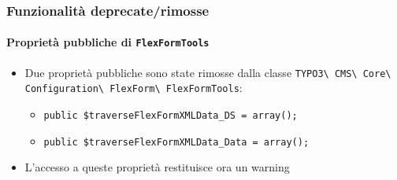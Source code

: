 \begin{frame}[fragile]
	\frametitle{Funzionalità deprecate/rimosse}
	\framesubtitle{Proprietà pubbliche di \texttt{FlexFormTools}}

	\begin{itemize}
		\item Due proprietà pubbliche sono state rimosse dalla classe
			\texttt{TYPO3\textbackslash
				CMS\textbackslash
				Core\textbackslash
				Configuration\textbackslash
				FlexForm\textbackslash
				FlexFormTools}:

		\begin{itemize}
			\item \texttt{public \$traverseFlexFormXMLData\_DS = array();}
			\item \texttt{public \$traverseFlexFormXMLData\_Data = array();}
		\end{itemize}

		\item L'accesso a queste proprietà restituisce ora un warning

	\end{itemize}

\end{frame}



